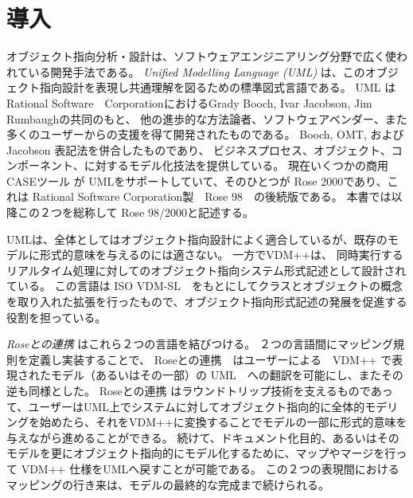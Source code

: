 \documentclass[\pformat,12pt]{jarticle}
\newcommand{\vdmpp}{VDM++}
\newcommand{\link}{Roseとの連携}
\newcommand{\rose}{Rose 98/2000}
\begin{document}




\section{導入} \label{intro}

オブジェクト指向分析・設計は、ソフトウェアエンジニアリング分野で広く使われている開発手法である。
{\it Unified Modelling Language (UML)} は、このオブジェクト指向設計を表現し共通理解を図るための標準図式言語である。
UML はRational Software　CorporationにおけるGrady Booch, Ivar Jacobson, Jim Rumbaughの共同のもと、 他の進歩的な方法論者、ソフトウェアベンダー、また多くのユーザーからの支援を得て開発されたものである。
Booch, OMT, およびJacobson 表記法を併合したものであり、 ビジネスプロセス、オブジェクト、コンポーネント、に対するモデル化技法を提供している。
現在いくつかの商用 CASEツール が UMLをサポートしていて、そのひとつが Rose 2000であり、これは Rational Software Corporation製　Rose 98　の後続版である。
本書では以降この２つを総称して \rose{}と記述する。

UMLは、全体としてはオブジェクト指向設計によく適合しているが、既存のモデルに形式的意味を与えるのには適さない。
一方で\vdmpp{}は、 同時実行するリアルタイム処理に対してのオブジェクト指向システム形式記述として設計されている。
この言語は ISO VDM-SL　をもとにしてクラスとオブジェクトの概念を取り入れた拡張を行ったもので、オブジェクト指向形式記述の発展を促進する役割を担っている。

 {\it \link{}} はこれら２つの言語を結びつける。
２つの言語間にマッピング規則を定義し実装することで、 \link{}　はユーザーによる　\vdmpp{} で表現されたモデル（あるいはその一部）の UML　への翻訳を可能にし、またその逆も同様とした。
 \link{} はラウンドトリップ技術を支えるものであって、ユーザーはUML上でシステムに対してオブジェクト指向的に全体的モデリングを始めたら、それを\vdmpp{}に変換することでモデルの一部に形式的意味を与えながら進めることができる。
続けて、ドキュメント化目的、あるいはそのモデルを更にオブジェクト指向的にモデル化するために、マップやマージを行って \vdmpp{} 仕様をUMLへ戻すことが可能である。
この２つの表現間におけるマッピングの行き来は、モデルの最終的な完成まで続けられる。
\end{document}
